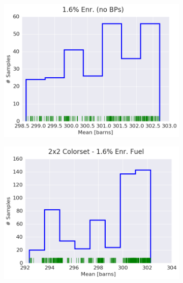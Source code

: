 \begin{figure}[h!]
\centering
\begin{subfigure}{0.5\textwidth}
  \centering
  \includegraphics[width=\linewidth]{figures/patterns/assm-1.6/hist-kde-rug/assm-16-fiss-2}
  \caption{}
  \label{fig:chap9-hist-assm-1.6-fiss}
\end{subfigure}%
\begin{subfigure}{0.5\textwidth}
  \centering
  \includegraphics[width=\linewidth]{figures/patterns/2x2/hist-kde-rug/16-enr-fiss-2}
  \caption{}
  \label{fig:chap9-hist-2x2-1.6-fiss}
\end{subfigure}
\begin{subfigure}{0.5\textwidth}
  \centering

\end{subfigure}
\end{figure}
